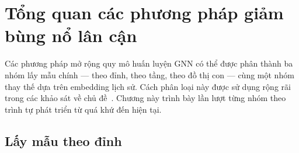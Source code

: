 \chapter{Tổng quan các phương pháp giảm bùng nổ lân cận}

Các phương pháp mở rộng quy mô huấn luyện GNN có thể được phân thành ba nhóm lấy mẫu chính --- theo đỉnh, theo tầng, theo đồ thị con --- cùng một nhóm thay thế dựa trên embedding lịch sử. Cách phân loại này được sử dụng rộng rãi trong các khảo sát về chủ đề~\cite{Younesian2023GRAPES}. Chương này trình bày lần lượt từng nhóm theo trình tự phát triển từ quá khứ đến hiện tại.

\section{Lấy mẫu theo đỉnh}

